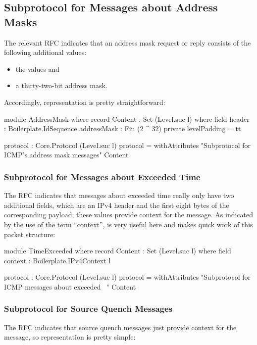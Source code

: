 \documentclass{report}
\begin{document}
\begin{itemize}
\section{Subprotocol for Messages about Address Masks}
The relevant RFC indicates that an address mask request or reply consists of the following additional values:

\begin{itemize}
  \item the  values and
  \item a thirty-two-bit address mask.
\end{itemize}

Accordingly, representation is pretty straightforward:

\begin{code}
    module AddressMask where
      record Content : Set (Level.suc l) where
        field
          header : Boilerplate.IdSequence
          addressMask : Fin (2 ^ 32)
        private
          levelPadding = tt

      protocol : Core.Protocol (Level.suc l)
      protocol = withAttributes "Subprotocol for ICMP's address mask messages"
                                Content
\end{code}

\subsubsection{Subprotocol for Messages about Exceeded Time}
The RFC indicates that messages about exceeded time really only have two additional fields, which are an IPv4 header and the first eight bytes of the corresponding payload; these values provide context for the message.  As indicated by the use of the term ``context'',  is very useful here and makes quick work of this packet structure:

\begin{code}
    module TimeExceeded where
      record Content : Set (Level.suc l) where
        field
          context : Boilerplate.IPv4Context l

      protocol : Core.Protocol (Level.suc l)
      protocol = withAttributes "Subprotocol for ICMP messages about exceeded \
                                \time"
                                Content
\end{code}

\subsubsection{Subprotocol for Source Quench Messages}
The RFC indicates that source quench messages just provide context for the message, so representation is pretty simple:


\end{itemize}
\end{document}
